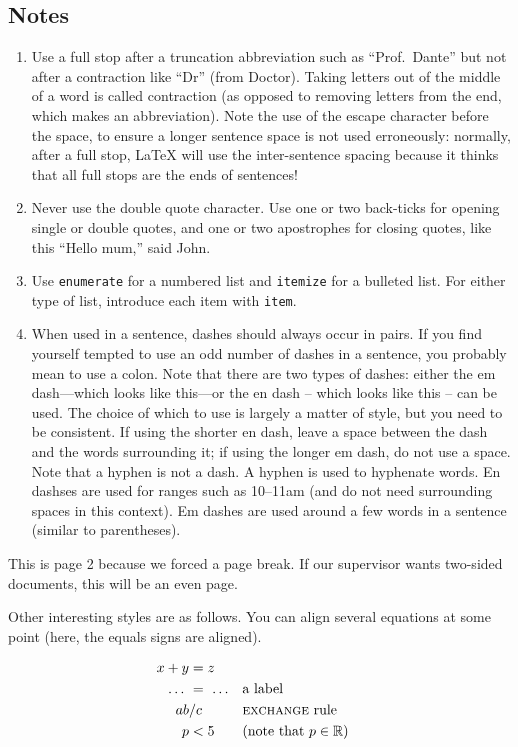 \documentclass[10pt,\jkfside,a4paper]{article}
\begin{document}
\subsection*{Notes}
\begin{enumerate}
\item
Use a full stop after a truncation abbreviation such as ``Prof.\  Dante'' but not after a contraction like ``Dr'' (from Doctor).
Taking letters out of the middle of a word is called contraction (as opposed to removing letters from the end, which makes an abbreviation).
Note the use of the escape character before the space, to ensure a longer sentence space is not used erroneously: normally, after a full stop, LaTeX will use the inter-sentence spacing because it thinks that all full stops are the ends of sentences!
\item
Never use the double quote character.
Use one or two back-ticks for opening single or double quotes, and one or two apostrophes for closing quotes, like this ``Hello mum,'' said John.
\item
Use \texttt{enumerate} for a numbered list and \texttt{itemize} for a bulleted list.
For either type of list, introduce each item with \texttt{item}.
\item
When used in a sentence, dashes should always occur in pairs.
If you find yourself tempted to use an odd number of dashes in a sentence, you probably mean to use a colon.
Note that there are two types of dashes: either the em dash---which looks like this---or the en dash -- which looks like this -- can be used.
The choice of which to use is largely a matter of style, but you need to be consistent.
If using the shorter en dash, leave a space between the dash and the words surrounding it; if using the longer em dash, do not use a space.
Note that a hyphen is not a dash.
A hyphen is used to hyphenate words.  En dashses are used for ranges such as 10--11am (and do not need surrounding spaces in this context).  Em dashes are used around a few words in a sentence (similar to parentheses).
\end{enumerate}

\newpage

This is page 2 because we forced a page break.
If our supervisor wants two-sided documents, this will be an even page.

Other interesting styles are as follows.  You can align several equations at some point (here, the equals signs are aligned).

\begin{align*}
x + y  &= z                                             \\
\dots\ &=\ \dots     && \text{a label}                  \\
  a b  &/ c          && \text{\textsc{exchange} rule}   \\
p      &< 5          && \text{(note that $p\in\mathbb{R}$)}
\end{align*}
\end{document}
